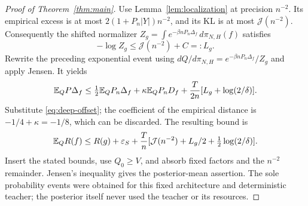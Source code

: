 \begin{proof}[Proof of Theorem~\ref{thm:main}]
Use Lemma~\ref{lem:localization} at precision $n^{-2}$. Its empirical excess is at most $2(1+P_n|Y|)n^{-2}$, and its KL is at most $\mathcal J(n^{-2})$. Consequently the shifted normalizer
$Z_g=\int e^{-\beta nP_n\Delta_f}\,d\pi_{N,H}(f)$ satisfies
\[
 -\log Z_g\le\mathcal J(n^{-2})+C=:L_g.
\]
Rewrite the preceding exponential event using
$dQ/d\pi_{N,H}=e^{-\beta nP_n\Delta_f}/Z_g$ and apply Jensen. It yields
\[
 \mathbb E_QP\Delta_f\le\tfrac12\mathbb E_QP_n\Delta_f
 +\kappa\mathbb E_QP_nD_f+\frac T{2n}[L_g+\log(2/\delta)].
\]
Substitute \eqref{eq:deep-offset}; the coefficient of the empirical distance is $-1/4+\kappa=-1/8$, which can be discarded. The resulting bound is
\[
 \mathbb E_QR(f)\le R(g)+\varepsilon_S+
 \frac Tn[\mathcal J(n^{-2})+L_g/2+\tfrac12\log(2/\delta)].
\]
Insert the stated bounds, use $Q_0\ge V$, and absorb fixed factors and the $n^{-2}$ remainder. Jensen's inequality gives the posterior-mean assertion. The sole probability events were obtained for this fixed architecture and deterministic teacher; the posterior itself never used the teacher or its resources.
\end{proof}
